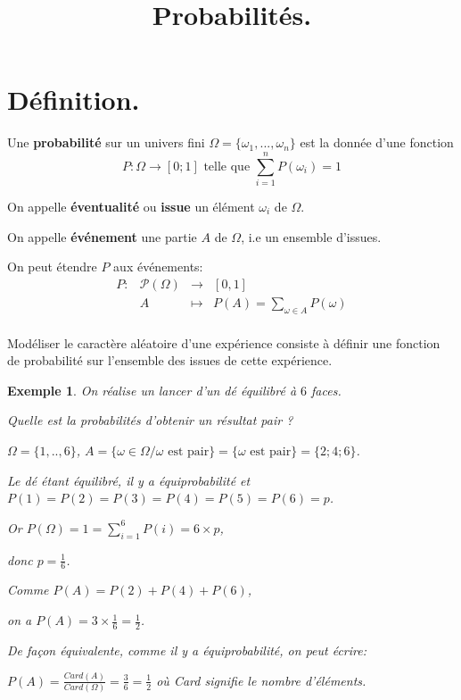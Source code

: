 \documentclass[a4paper,11pt]{article}
\title{Probabilités.}
\author{}
\date{}
\theoremstyle{break}
\newcounter{enonce}
\newtheorem{exemple}[enonce]{Exemple}
\begin{document}
 
  \maketitle


  
  \section{Définition.}
 
  \begin{definition}
  Une \textbf{probabilité} sur un univers fini 
  $\Omega=\lbrace \omega_1,...,\omega_n \rbrace$ est la donnée
  d'une fonction $$P:\Omega \to [0;1] \textrm{ telle que }
  \sum_{i=1}^n P(\omega_i)=1$$
  
  On appelle \textbf{éventualité} ou \textbf{issue} un élément 
  $\omega_i$ de $\Omega$.
  
  On appelle \textbf{événement} une partie $A$ de $\Omega$, i.e un ensemble d'issues.
  
  On peut étendre $P$ aux événements:
  $$
  \begin{array}{llll}
		P:&\mathcal{P}(\Omega) &\to& [0,1] \\
		  &A                   & \mapsto &
		  P(A)=\sum\limits_{\omega \in A} P(\omega)\\
  \end{array}
  $$
   
  \end{definition}
  
   Modéliser le caractère aléatoire d'une expérience consiste à définir une fonction de probabilité 
  sur l'ensemble des issues de cette expérience.
  
     \begin{exemple} 
   On réalise un lancer d'un dé équilibré à $6$ faces.
   
   Quelle est la probabilités d'obtenir un résultat pair ?
   
   $\Omega=\lbrace 1,..,6 \rbrace$, $A=
   \lbrace \omega \in \Omega / \omega \textrm{ est pair} \rbrace=
   \lbrace \omega
    \textrm{ est pair} \rbrace =\lbrace 2;4;6 \rbrace$.
    
    Le dé étant équilibré, il y a 
    équiprobabilité et $P(1)=P(2)=P(3)=P(4)=P(5)=P(6)=p$.
    
    Or $P(\Omega)=1=\sum\limits_{i=1}^6 P(i)=6 \times p$,
    
    donc $p=\frac{1}{6}$.
    
    Comme $P(A)=P(2)+P(4)+P(6)$,
    
    on a $P(A)=3 \times \frac{1}{6}=\frac{1}{2}$.
    
    De façon équivalente, comme il y a équiprobabilité, on peut écrire:
    
    $P(A)=\frac{Card(A)}{Card(\Omega)}=\frac{3}{6}=\frac{1}{2}$ où Card signifie le nombre d'éléments.

  \end{exemple}
  
\end{document}
